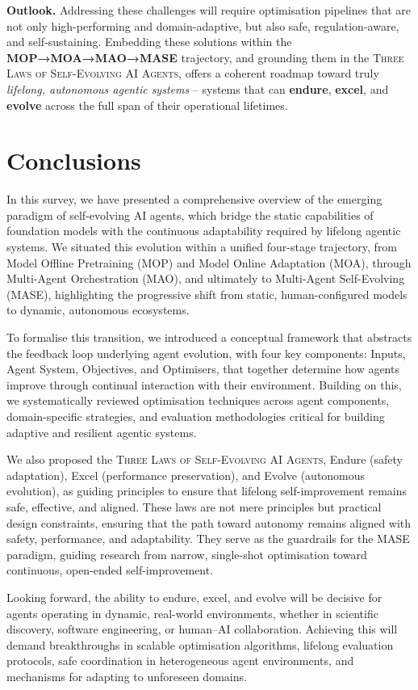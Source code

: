 \documentclass[]{selfevolagent}
\theoremstyle{plain}
\theoremstyle{definition}
\theoremstyle{remark}
\newcommand{\ThreeLaws}{{\scshape\color{selfevolagent_dark!120} Three Laws of Self-Evolving AI Agents}}
\begin{document}
\noindent
\textbf{Outlook.} Addressing these challenges will require optimisation pipelines that are not only high-performing and domain-adaptive, but also safe, regulation-aware, and self-sustaining. Embedding these solutions within the \textbf{MOP→MOA→MAO→MASE} trajectory, and grounding them in the \ThreeLaws{}, offers a coherent roadmap toward truly \textit{lifelong, autonomous agentic systems} -- systems that can \textbf{endure}, \textbf{excel}, and \textbf{evolve} across the full span of their operational lifetimes.

\section{Conclusions}
\label{sec:conclusions}
In this survey, we have presented a comprehensive overview of the emerging paradigm of self-evolving AI agents, which bridge the static capabilities of foundation models with the continuous adaptability required by lifelong agentic systems. We situated this evolution within a unified four-stage trajectory, from Model Offline Pretraining (MOP) and Model Online Adaptation (MOA), through Multi-Agent Orchestration (MAO), and ultimately to Multi-Agent Self-Evolving (MASE), highlighting the progressive shift from static, human-configured models to dynamic, autonomous ecosystems.

To formalise this transition, we introduced a conceptual framework that abstracts the feedback loop underlying agent evolution, with four key components: Inputs, Agent System, Objectives, and Optimisers, that together determine how agents improve through continual interaction with their environment. Building on this, we systematically reviewed optimisation techniques across agent components, domain-specific strategies, and evaluation methodologies critical for building adaptive and resilient agentic systems.

We also proposed the \ThreeLaws{}, Endure (safety adaptation), Excel (performance preservation), and Evolve (autonomous evolution), as guiding principles to ensure that lifelong self-improvement remains safe, effective, and aligned. These laws are not mere principles but practical design constraints, ensuring that the path toward autonomy remains aligned with safety, performance, and adaptability. They serve as the guardrails for the MASE paradigm, guiding research from narrow, single-shot optimisation toward continuous, open-ended self-improvement.

Looking forward, the ability to endure, excel, and evolve will be decisive for agents operating in dynamic, real-world environments, whether in scientific discovery, software engineering, or human–AI collaboration. Achieving this will demand breakthroughs in scalable optimisation algorithms, lifelong evaluation protocols, safe coordination in heterogeneous agent environments, and mechanisms for adapting to unforeseen domains.
\end{document}
